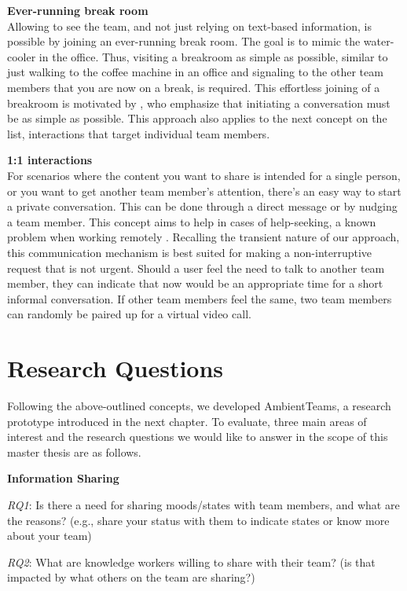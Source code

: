 \medskip\noindent\textbf{Ever-running break room} \\
Allowing to see the team, and not just relying on text-based information, is possible by joining an ever-running break room. The goal is to mimic the water-cooler in the office. Thus, visiting a breakroom as simple as possible, similar to just walking to the coffee machine in an office and signaling to the other team members that you are now on a break, is required. This effortless joining of a breakroom is motivated by \textcite{chang2007out}, who emphasize that initiating a conversation must be as simple as possible. This approach also applies to the next concept on the list, interactions that target individual team members.

\medskip\noindent\textbf{1:1 interactions} \\
For scenarios where the content you want to share is intended for a single person, or you want to get another team member's attention, there's an easy way to start a private conversation. This can be done through a direct message or by nudging a team member. This concept aims to help in cases of help-seeking, a known problem when working remotely \autocite{herbsleb2003empirical}. Recalling the transient nature of our approach, this communication mechanism is best suited for making a non-interruptive request that is not urgent. Should a user feel the need to talk to another team member, they can indicate that now would be an appropriate time for a short informal conversation. If other team members feel the same, two team members can randomly be paired up for a virtual video call.

\section{Research Questions}
Following the above-outlined concepts, we developed AmbientTeams, a research prototype introduced in the next chapter. To evaluate, three main areas of interest and the research questions we would like to answer in the scope of this master thesis are as follows.

\medskip\noindent\textbf{Information Sharing}

\smallskip\noindent\textit{RQ1}: Is there a need for sharing moods/states with team members, and what are the reasons? (e.g., share your status with them to indicate states or know more about your team)

\smallskip\noindent\textit{RQ2}: What are knowledge workers willing to share with their team? (is that impacted by what others on the team are sharing?)


